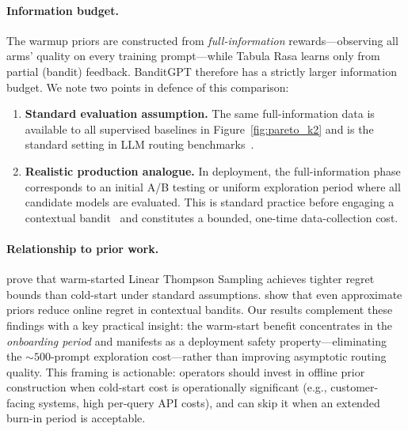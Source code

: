 \paragraph{Information budget.}
The warmup priors are constructed from \emph{full-information}
rewards---observing all arms' quality on every training prompt---while
Tabula Rasa learns only from partial (bandit) feedback.
BanditGPT therefore has a strictly larger information budget.
We note two points in defence of this comparison:

\begin{enumerate}[leftmargin=*,noitemsep]
  \item \textbf{Standard evaluation assumption.}
        The same full-information data is available to all supervised
        baselines in Figure~\ref{fig:pareto_k2} and is the standard
        setting in LLM routing benchmarks~\cite{ong2024routellm,
        panda2025pilot}.
  \item \textbf{Realistic production analogue.}
        In deployment, the full-information phase corresponds to an
        initial A/B testing or uniform exploration period where all
        candidate models are evaluated.  This is standard practice
        before engaging a contextual
        bandit~\cite{kveton2023warmstart} and constitutes a bounded,
        one-time data-collection cost.
\end{enumerate}

\paragraph{Relationship to prior work.}
\citet{kveton2023warmstart} prove that warm-started Linear Thompson
Sampling achieves tighter regret bounds than cold-start under
standard assumptions.
\citet{pan2024cbli} show that even approximate priors reduce
online regret in contextual bandits.
Our results complement these findings with a key practical insight:
the warm-start benefit concentrates in the \emph{onboarding period}
and manifests as a deployment safety property---eliminating the
${\sim}500$-prompt exploration cost---rather than improving
asymptotic routing quality.
This framing is actionable: operators should invest in offline
prior construction when cold-start cost is operationally significant
(e.g., customer-facing systems, high per-query API costs), and
can skip it when an extended burn-in period is acceptable.
